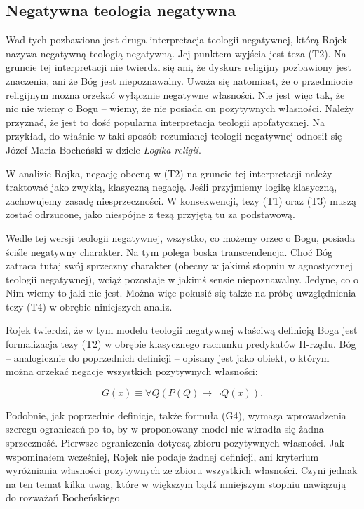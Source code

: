 \subsection{Negatywna teologia negatywna}

Wad tych pozbawiona jest druga interpretacja teologii negatywnej, którą
Rojek nazywa negatywną teologią negatywną. Jej punktem wyjścia jest
teza (T2). Na gruncie tej interpretacji nie twierdzi się ani, że
dyskurs religijny pozbawiony jest znaczenia, ani że Bóg jest
niepoznawalny. Uważa się natomiast, że o przedmiocie religijnym można
orzekać wyłącznie negatywne własności. Nie jest więc tak, że nic nie
wiemy o Bogu -- wiemy, że nie posiada on pozytywnych własności. Należy
przyznać, że jest to dość popularna interpretacja teologii
apofatycznej. Na przykład, do właśnie w taki sposób rozumianej teologii
negatywnej odnosił się Józef Maria Bocheński w dziele \textit{Logika
religii}.

W analizie Rojka, negację obecną w (T2) na gruncie tej interpretacji
należy traktować jako zwykłą, klasyczną negację. Jeśli przyjmiemy
logikę klasyczną, zachowujemy zasadę niesprzeczności. W konsekwencji,
tezy (T1) oraz (T3) muszą zostać odrzucone, jako niespójne z tezą
przyjętą tu za podstawową.

Wedle tej wersji teologii negatywnej, wszystko, co możemy orzec o Bogu,
posiada ściśle negatywny charakter. Na tym polega boska transcendencja.
Choć Bóg zatraca tutaj swój sprzeczny charakter (obecny w jakimś
stopniu w agnostycznej teologii negatywnej), wciąż pozostaje w jakimś
sensie niepoznawalny. Jedyne, co o Nim wiemy to jaki nie jest. Można
więc pokusić się także na próbę uwzględnienia tezy (T4) w obrębie
niniejszych analiz.

Rojek twierdzi, że w tym modelu teologii negatywnej właściwą definicją
Boga jest formalizacja tezy (T2) w obrębie klasycznego rachunku
predykatów II-rzędu. Bóg -- analogicznie do poprzednich definicji –
opisany jest jako obiekt, o którym można orzekać negacje wszystkich
pozytywnych własności:


\begin{equation}\label{G4}\tag{G4}
    G(x) \equiv  \forall Q (P(Q) \to
\neg Q(x)).
\end{equation}





Podobnie, jak poprzednie definicje, także formuła (G4), wymaga
wprowadzenia szeregu ograniczeń po to, by w proponowany model nie
wkradła się żadna sprzeczność. Pierwsze ograniczenia dotyczą zbioru
pozytywnych własności. Jak wspominałem wcześniej, Rojek nie podaje
żadnej definicji, ani kryterium wyróżniania własności pozytywnych ze
zbioru wszystkich własności. Czyni jednak na ten temat kilka uwag,
które w większym bądź mniejszym stopniu nawiązują do rozważań
Bocheńskiego

